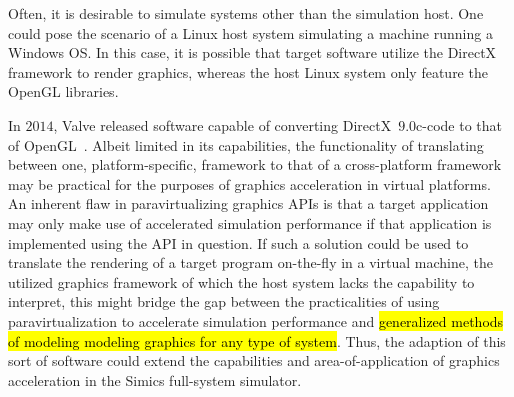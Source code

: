 Often, it is desirable to simulate systems other than the simulation host.
One could pose the scenario of a Linux host system simulating a machine running a Windows OS.
In this case, it is possible that target software utilize the DirectX framework to render graphics, whereas the host Linux system only feature the OpenGL libraries.

In $2014$, Valve released software capable of converting DirectX~$9.0$c-code to that of OpenGL~.
Albeit limited in its capabilities, the functionality of translating between one, platform-specific, framework to that of a cross-platform framework may be practical for the purposes of graphics acceleration in virtual platforms.
An inherent flaw in paravirtualizing graphics APIs is that a target application may only make use of accelerated simulation performance if that application is implemented using the API in question.
If such a solution could be used to translate the rendering of a target program on-the-fly in a virtual machine, the utilized graphics framework of which the host system lacks the capability to interpret, this might bridge the gap between the practicalities of using paravirtualization to accelerate simulation performance and \hl{generalized methods of modeling modeling graphics for any type of system}.
Thus, the adaption of this sort of software could extend the capabilities and area-of-application of graphics acceleration in the Simics full-system simulator.


